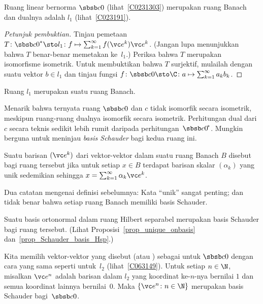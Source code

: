 \begin{exam}\label{exam_dual_C0} Ruang linear bernorma $\sbsb c0$ (lihat~\ref{C0231303})
merupakan ruang Banach dan dualnya adalah $l_1$ (lihat~\ref{C023191}).
\end{exam}

\begin{proof}[\emph{Petunjuk pembuktian}] Tinjau pemetaan
$T\colon {\sbsb c0}^* \sto l_1\colon f \mapsto \sum_{k=1}^\infty f(\vc e^k)\vc e^k$.
(Jangan lupa menunjukkan bahwa $T$ benar-benar memetakan ke~$l_1$.) Periksa bahwa $T$ merupakan isomorfisme isometrik.
Untuk membuktikan bahwa $T$ surjektif, mulailah dengan suatu vektor $b \in l_1$ dan tinjau fungsi
$f\colon \sbsb c0 \sto \C\colon a \mapsto \sum_{k=1}^\infty a_kb_k$.    \ns
\end{proof}

\begin{cor} Ruang $l_1$ merupakan suatu
ruang Banach.
\end{cor}

Menarik bahwa ternyata ruang $\sbsb c0$ dan $c$ tidak isomorfik secara isometrik,
meskipun ruang-ruang dualnya isomorfik secara isometrik. Perhitungan dual dari $c$ secara teknis sedikit lebih rumit daripada
perhitungan~${\sbsb c0}^{\!*}$. Mungkin berguna untuk meninjau \emph{basis Schauder} bagi kedua ruang ini.

\begin{defn} Suatu barisan $(\vc e^k)$ dari vektor-vektor dalam suatu ruang Banach $B$ disebut
 bagi ruang tersebut jika untuk setiap $x \in B$ terdapat barisan skalar $(\alpha_k)$ yang unik
sedemikian sehingga $x = \sum_{k=1}^\infty \alpha_k \vc e^k$.
\end{defn}

Dua catatan mengenai definisi sebelumnya: Kata ``unik'' sangat penting; dan tidak benar bahwa
setiap ruang Banach memiliki basis Schauder.

\begin{exam} Suatu basis ortonormal dalam ruang Hilbert separabel merupakan basis Schauder bagi ruang tersebut. (Lihat
Proposisi~\ref{prop_unique_onbasis} dan~\ref{prop_Schauder_basis_Hsp}.)
\end{exam}

\begin{exam}\label{exam_dual_c0} Kita memilih
vektor-vektor yang disebut  (atau
) sebagai  untuk $\sbsb c0$ dengan cara yang sama seperti untuk~$l_2$ (lihat~\ref{C063149}).
Untuk setiap $n \in \N$, misalkan $\vc e^n$ adalah barisan dalam $l_2$ yang koordinat ke-$n$-nya bernilai $1$
dan semua koordinat lainnya bernilai~$0$. Maka $\{\vc e^n\colon n \in \N\}$ merupakan basis Schauder
bagi~$\sbsb c0$.
\end{exam}

